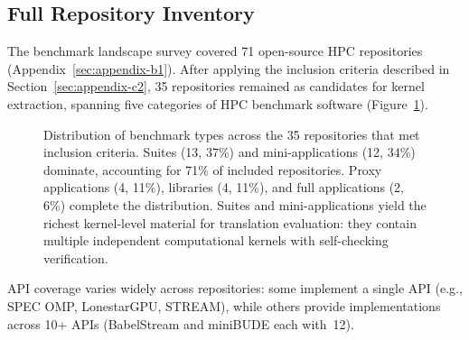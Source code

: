 \subsection{Full Repository Inventory}
\label{sec:appendix-c1}

The benchmark landscape survey covered 71 open-source HPC repositories (Appendix~\ref{sec:appendix-b1}). After applying the inclusion criteria described in Section~\ref{sec:appendix-c2}, 35 repositories remained as candidates for kernel extraction, spanning five categories of HPC benchmark software (Figure~\ref{fig:benchmark-types}).


\begin{figure}[htbp]
    \centering
    
    \caption{Distribution of benchmark types across the 35 repositories that met inclusion criteria. Suites (13, 37\%) and mini-applications (12, 34\%) dominate, accounting for 71\% of included repositories. Proxy applications (4, 11\%), libraries (4, 11\%), and full applications (2, 6\%) complete the distribution. Suites and mini-applications yield the richest kernel-level material for translation evaluation: they contain multiple independent computational kernels with self-checking verification.}
    \label{fig:benchmark-types}
\end{figure}

API coverage varies widely across repositories: some implement a single API (e.g., SPEC OMP, LonestarGPU, STREAM), while others provide implementations across 10+ APIs (BabelStream and miniBUDE each with~12).

